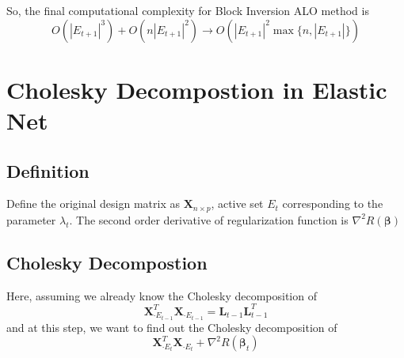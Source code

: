 \documentclass[letter]{article}
\begin{document}
	So, the final computational complexity for Block Inversion ALO method is 
	$$O(|E_{t+1}|^3)+O\left(n|E_{t+1}|^2\right)\rightarrow O\left(|E_{t+1}|^2\max\{n,|E_{t+1}|\}\right)$$
	
	\section{Cholesky Decompostion in Elastic Net}
	
	\subsection{Definition}
	
	Define the original design matrix as $\bm{X}_{n\times p}$, active set $E_t$ corresponding to the parameter $\lambda_{t}$. The second order derivative of regularization function is $\nabla^2R(\bm{\beta})$
	
	\subsection{Cholesky Decompostion}
	
	Here, assuming we already know the Cholesky decomposition of 
	$$\bm{X}_{\cdot E_{t-1}}^T\bm{X}_{\cdot E_{t-1}}
	=\bm{L}_{t-1}\bm{L}_{t-1}^T$$
	and at this step, we want to find out the Cholesky decomposition of 
	$$\bm{X}_{\cdot E_{t}}^T\bm{X}_{\cdot E_{t}}+\nabla^2R(\bm{\beta}_{t})$$
	
\end{document}
